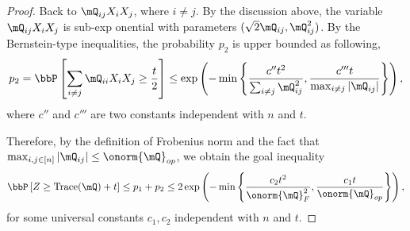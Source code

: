 \documentclass[11pt]{article}
\DeclareMathOperator{\tr}{Trace}
\newcommand{\of}[1]{\left(#1\right)}
\newcommand{\off}[1]{\left[#1\right]}
\newcommand{\offf}[1]{\left\{#1\right\}}
\theoremstyle{plain}
\theoremstyle{definition}
\begin{document}
\begin{proof}
    	\vspace{0.2cm}
    	Back to $\mQ_{ij} X_i X_j$, where $i \neq j$. By the discussion above, the variable $\mQ_{ij} X_i X_j$ is sub-exp onential with parameters $(\sqrt{2} \mQ_{ij}, \mQ_{ij}^2)$. By the Bernstein-type inequalities, the probability $p_2$ is upper bounded as following,
    	\begin{equation}
    		p_2 = \bbP \off{ \sum_{i \neq j} \mQ_{ii} X_i X_j  \geq \frac{t}{2}} \leq \exp \of{ - \min \offf{  \frac{c'' t^2}{\sum_{i\neq j} \mQ^2_{ij} }, \frac{c'''t}{\max_{i\neq j   }|\mQ_{ij}| } }},
    	\end{equation}
    	where $c''$ and $c'''$ are two constants independent with $n$ and $t$.
    	
    	\vspace{0.2cm}
    	
    	Therefore, by the definition of Frobenius norm and the fact that $\max_{i,j\in[n]}|\mQ_{ij}| \leq \onorm{\mQ}_{op} $, we obtain the goal inequality
    	\begin{equation}
    		\bbP \off{ Z \geq \tr(\mQ) +  t } \leq p_1 + p_2 \leq 2\exp \of{ - \min \offf{  \frac{c_2 t^2}{\onorm{\mQ}^2_F}, \frac{c_1t}{\onorm{\mQ}_{op} }} },
    	\end{equation}
    	for some universal constants $c_1,c_2$ independent with $n$ and $t$.
    \end{proof}
    
\end{document}

